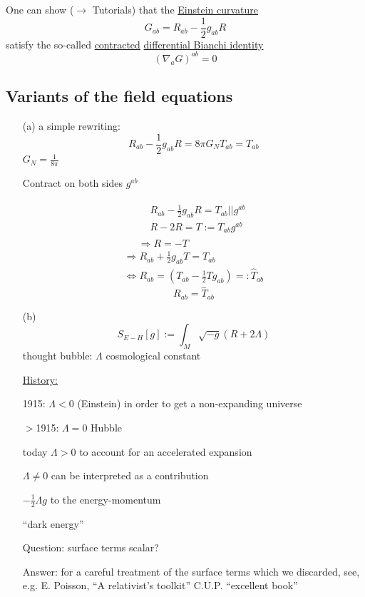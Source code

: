 \documentclass[10pt, twoside]{amsart}
\begin{document}
\begin{multicols*}{2}
One can show ($\to$ Tutorials) that the \underline{Einstein curvature}
\[
G_{ab} = R_{ab} - \frac{1}{2} g_{ab}R
\]
satisfy the so-called \underline{contracted} \underline{differential Bianchi identity}
\[
(\nabla_a G)^{ab} =0 
\]

\subsection{Variants of the field equations}

\begin{enumerate}
\item[(a)] a simple rewriting:
\[
R_{ab} - \frac{1}{2} g_{ab} R = 8 \pi G_N T_{ab} = T_{ab}
\]
$G_N = \frac{1}{8\pi}$

Contract on both sides $g^{ab}$

\[
\begin{gathered}
\begin{aligned}
  & R_{ab} - \frac{1}{2} g_{ab} R = T_{ab} || g^{ab} \\ 
  & R - 2R = T := T_{ab}g^{ab}
\end{aligned} \\
\Longrightarrow R = -T
\end{gathered}
\]
\[
\begin{gathered}
\Longrightarrow R_{ab} + \frac{1}{2} g_{ab} T = T_{ab} \\
\Longleftrightarrow R_{ab} = (T_{ab} - \frac{1}{2} Tg_{ab}) =: \widehat{T}_{ab}
\end{gathered}
\]
\[
\boxed{ R_{ab} = \widehat{T}_{ab}}
\]

\item[(b)] \[
S_{E-H}[g] := \int_M \sqrt{-g} (R+ 2\Lambda)
\]
thought bubble: $\Lambda$ cosmological constant

\underline{History:}

1915: $\Lambda < 0$ (Einstein) in order to get a non-expanding universe

$>$1915: $\Lambda =0$ Hubble 

today $\Lambda > 0$ to account for an accelerated expansion

$\Lambda \neq 0$ can be interpreted as a contribution

$-\frac{1}{2} \Lambda g$ to the energy-momentum 

``dark energy''

Question: surface terms scalar?

Answer: for a careful treatment of the surface terms which we discarded, see, e.g. E. Poisson, ``A relativist's toolkit'' C.U.P. ``excellent book''


\end{enumerate}
\end{multicols*}
\end{document}

